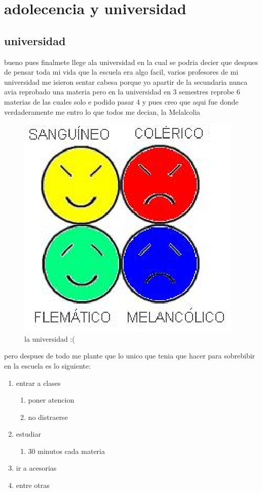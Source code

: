 \chapter{adolecencia y universidad}
\section{universidad}
bueno pues finalmete llege ala universidad en la cual se podria decier que despues de pensar toda mi vida que la escuela era algo facil,
varios profesores de mi universidad
me isieron sentar cabesa porque yo apartir de la secundaria nunca avia reprobado una materia
pero en la universidad en 3 semestres reprobe 6 materias de las cuales solo e podido pasar 4 
y pues creo que aqui fue donde verdaderamente me entro lo que todos me decian, 
la Melalcolia
\begin{figure}[H]
\centering
\includegraphics{sixChapter/mela.eps}
\caption{la universidad :(}
\label{universidad}
\end{figure}
pero despues de todo me plante que lo unico que tenia que hacer para sobrebibir en la escuela es lo siguiente:
\begin{enumerate}[1.]
\item entrar a clases
	\begin{enumerate}[a-]
		\item poner atencion
		\item no distraerse 
	\end{enumerate}
\item estudiar 
	\begin{enumerate}[a-]
                \item 30 minutos cada materia
        \end{enumerate}
\item ir a acesorias
\item entre otras
\end{enumerate}
